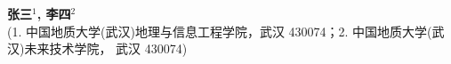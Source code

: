 \documentclass[a4paper,onecolumn,twosize]{article}
\begin{document}
  

    \thispagestyle{plain}
            \begin{center}
              \parbox{\textwidth}{
                \vspace{25pt}
                \begin{center}
                  {}\\[2pt]
                  {}\\
                \vspace{3pt}
                \end{center}
                \begin{center}
                  {\sihao\textbf{张三$^1$, 李四$^2$}}\\[2pt]
                  {\liuhao(1. 中国地质大学(武汉)地理与信息工程学院，武汉 430074；2. 中国地质大学(武汉)未来技术学院， 武汉 430074)}\\[2pt]
                \end{center}
                {}

              }
            \end{center}
\end{document}

